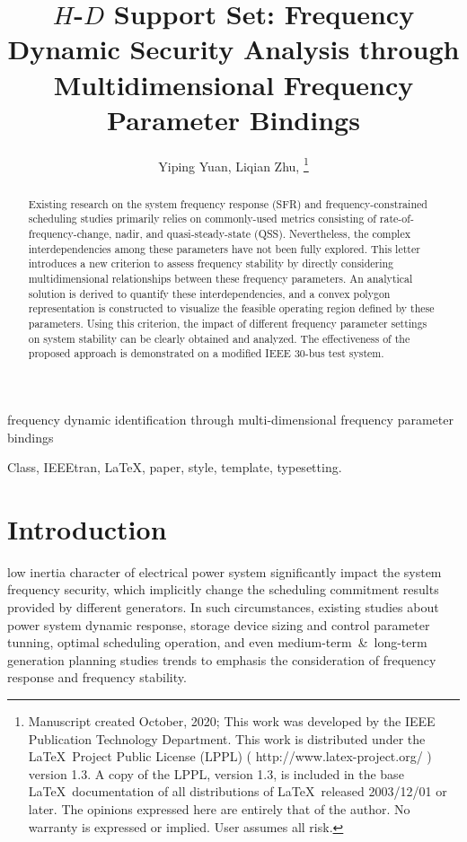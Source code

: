 \documentclass[lettersize,journal]{IEEEtran}
\begin{document}


\title{$H$-$D$ Support Set: Frequency Dynamic Security Analysis through Multidimensional Frequency Parameter Bindings}
\author{Yiping Yuan, Liqian Zhu,
\thanks{Manuscript created October, 2020; This work was developed by the IEEE Publication Technology Department. This work is distributed under the \LaTeX \ Project Public License (LPPL) ( http://www.latex-project.org/ ) version 1.3. A copy of the LPPL, version 1.3, is included in the base \LaTeX \ documentation of all distributions of \LaTeX \ released 2003/12/01 or later. The opinions expressed here are entirely that of the author. No warranty is expressed or implied. User assumes all risk.}}

%
{frequency dynamic identification through multi-dimensional frequency parameter bindings}

\maketitle

\begin{abstract}

  Existing research on the system frequency response (SFR) and frequency-constrained scheduling studies primarily relies on commonly-used metrics consisting of rate-of-frequency-change, nadir, and quasi-steady-state (QSS). Nevertheless, the complex interdependencies among these parameters have not been fully explored. This letter introduces a new criterion to assess frequency stability by directly considering multidimensional relationships between these frequency parameters. An analytical solution is derived to quantify these interdependencies, and a convex polygon representation is constructed to visualize the feasible operating region defined by these parameters. Using this criterion, the impact of different frequency parameter settings on system stability can be clearly obtained and analyzed. The effectiveness of the proposed approach is demonstrated on a modified IEEE 30-bus test system.

\end{abstract}

\begin{IEEEkeywords}
Class, IEEEtran, \LaTeX, paper, style, template, typesetting.
\end{IEEEkeywords}

\section{Introduction}
 low inertia character of electrical power system significantly impact the system frequency security, which implicitly change the scheduling commitment results provided by different generators. In such circumstances, existing studies about power system dynamic response, storage device sizing and control parameter tunning, optimal scheduling operation, and even medium-term~\&~long-term generation planning studies trends to emphasis the consideration of frequency response and frequency stability.
\end{document}
